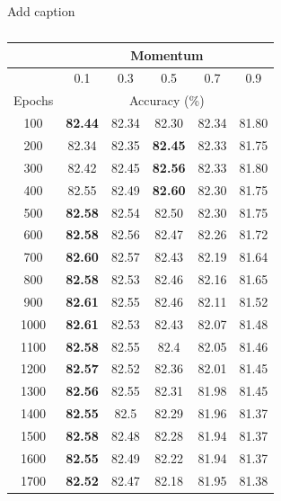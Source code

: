 \documentclass[12pt]{article}
\begin{document}
      \singlespacing
      \begin{table}[H]
        \caption{Add caption}
        \begin{subtable}{.49\linewidth}
          \centering
          \caption{}
          \begin{tabular}{c|ccccc}
            \toprule
                  & \multicolumn{5}{c}{Momentum} \\
            \midrule
                  & \multicolumn{1}{c|}{0.1} & \multicolumn{1}{c|}{0.3} & \multicolumn{1}{c|}{0.5} & \multicolumn{1}{c|}{0.7} & 0.9 \\
            \midrule
            Epochs & \multicolumn{5}{c}{Accuracy (\%)} \\
            \midrule
            100   & \textbf{82.44} & 82.34 & 82.30 & 82.34 & 81.80 \\
            200   & 82.34 & 82.35 & \textbf{82.45} & 82.33 & 81.75 \\
            300   & 82.42 & 82.45 & \textbf{82.56} & 82.33 & 81.80 \\
            400   & 82.55 & 82.49 & \textbf{82.60} & 82.30 & 81.75 \\
            500   & \textbf{82.58} & 82.54 & 82.50 & 82.30 & 81.75 \\
            600   & \textbf{82.58} & 82.56 & 82.47 & 82.26 & 81.72 \\
            700   & \textbf{82.60} & 82.57 & 82.43 & 82.19 & 81.64 \\
            800   & \textbf{82.58} & 82.53 & 82.46 & 82.16 & 81.65 \\
            900   & \textbf{82.61} & 82.55 & 82.46 & 82.11 & 81.52 \\
            1000  & \textbf{82.61} & 82.53 & 82.43 & 82.07 & 81.48 \\
            1100  & \textbf{82.58} & 82.55 & 82.4  & 82.05 & 81.46 \\
            1200  & \textbf{82.57} & 82.52 & 82.36 & 82.01 & 81.45 \\
            1300  & \textbf{82.56} & 82.55 & 82.31 & 81.98 & 81.45 \\
            1400  & \textbf{82.55} & 82.5  & 82.29 & 81.96 & 81.37 \\
            1500  & \textbf{82.58} & 82.48 & 82.28 & 81.94 & 81.37 \\
            1600  & \textbf{82.55} & 82.49 & 82.22 & 81.94 & 81.37 \\
            1700  & \textbf{82.52} & 82.47 & 82.18 & 81.95 & 81.38 \\

\end{tabular}
\end{subtable}
\end{table}
\end{document}
